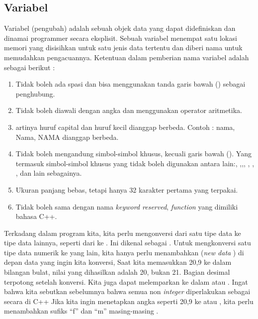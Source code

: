 \documentclass[../main.tex]{subfiles}
\begin{document}
\subsection{Variabel}
Variabel (pengubah) adalah sebuah objek data yang dapat didefiniskan dan dinamai programmer secara eksplisit. Sebuah variabel menempat satu lokasi memori yang disisihkan untuk satu jenis data tertentu dan diberi nama untuk memudahkan pengacuannya. Ketentuan dalam pemberian nama variabel adalah sebagai berikut \parencite{friyadi2005panduan}:
\begin{enumerate}
    \item {
        Tidak boleh ada spasi dan bisa menggunakan tanda garis bawah ({\underscore})  sebagai penghubung.
    }
    \item {
        Tidak boleh diawali dengan angka dan menggunakan operator aritmetika.
    }
    \item {
        {\Casesensitive} artinya huruf capital dan huruf kecil dianggap berbeda. Contoh : nama, Nama, NAMA dianggap berbeda.
    }
    \item {
        Tidak boleh mengandung simbol-simbol khusus, kecuali garis bawah ({\underscore}). Yang termasuk simbol-simbol khusus yang tidak boleh digunakan antara lain:\citecode{\$}, ,\citecode{\%},\citecode{\#}, \citecode{\&}, \citecode{*}, \citecode{-}, \citecode{+} dan lain sebagainya.
    }
    \item {
        Ukuran panjang bebas, tetapi hanya 32 karakter pertama yang terpakai.
    }
    \item {
        Tidak boleh sama dengan nama \textit{keyword reserved}, \textit{function} yang dimiliki bahasa C++.
    }
\end{enumerate}
\newpage
\subsectionf{{\Type} {\Casting}}

    Terkadang dalam program kita, kita perlu mengonversi dari satu tipe data ke tipe data lainnya, seperti dari  ke . Ini dikenal sebagai {\type} {\casting}. Untuk mengkonversi satu tipe data numerik ke yang lain, kita hanya perlu menambahkan (\textit{new data} {\type}) di depan data yang ingin kita konversi, Saat kita memasukkan 20,9 ke dalam bilangan bulat, nilai yang dihasilkan adalah 20, bukan 21. Bagian desimal terpotong setelah konversi. Kita juga dapat melemparkan  ke dalam  atau {\decimal}. Ingat bahwa kita sebutkan sebelumnya bahwa semua non {\textit{integer}} diperlakukan sebagai  secara {} di C++ Jika kita ingin menetapkan angka seperti 20,9 ke  atau {\decimal}, kita perlu menambahkan sufiks ``f'' dan ``m'' masing-masing \parencite{raharjo2022bahasac}.
\end{document}
